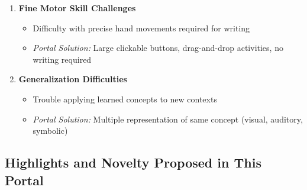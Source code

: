 \documentclass[12pt, a4paper]{article}
\begin{document}
\begin{tcolorbox}[colback=nebulapink!5, colframe=nebulapink, title=\textbf{Key Challenges Addressed}]
\begin{enumerate}[leftmargin=*, itemsep=8pt]
    \item \textbf{Fine Motor Skill Challenges}
    \begin{itemize}
        \item Difficulty with precise hand movements required for writing
        \item \textit{Portal Solution:} Large clickable buttons, drag-and-drop activities, no writing required
    \end{itemize}
    
    \item \textbf{Generalization Difficulties}
    \begin{itemize}
        \item Trouble applying learned concepts to new contexts
        \item \textit{Portal Solution:} Multiple representation of same concept (visual, auditory, symbolic)
    \end{itemize}
\end{enumerate}

\end{tcolorbox}

\subsection{Highlights and Novelty Proposed in This Portal}
\end{document}
